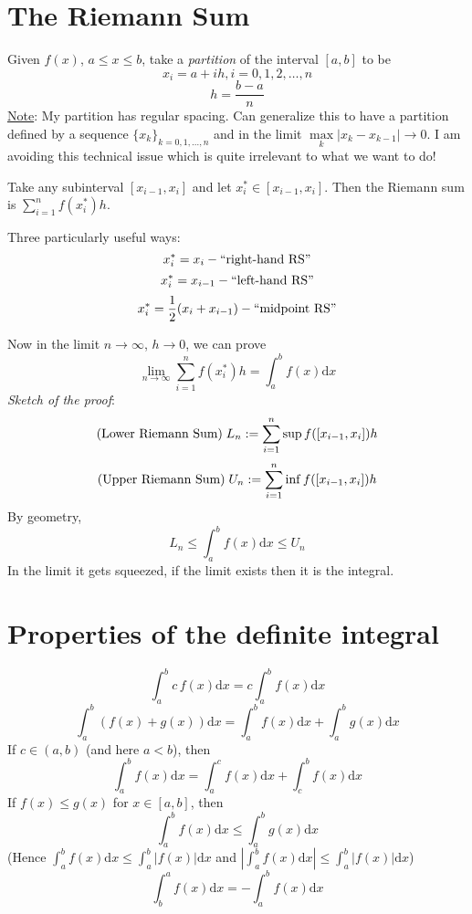 \documentclass[12pt]{report}
\theoremstyle{definition}
\begin{document}
\section{The Riemann Sum}
Given $f(x)$, $a \le x \le b$, take a \emph{partition} of the interval $[a,b]$ to be \[
    x_i = a + ih, i = 0,1,2,\ldots,n
\]\[
    h = \frac{b-a}{n}
\]
\underline{Note}: My partition has regular spacing. Can generalize this to have a partition defined by a sequence 
${\{x_k\}}_{k=0,1,\ldots,n}$ and in the limit $\max\limits_{k}\mathopen|x_k - x_{k-1}\mathclose| \rightarrow 0$.
I am avoiding this technical issue which is quite irrelevant to what we want to do!

Take any subinterval $[x_{i-1}, x_i]$ and let $x^*_i \in [x_{i-1}, x_i]$. Then the Riemann sum is $\sum_{i=1}^n f(x_i^*)h$.

Three particularly useful ways: \[
    x^*_i = x_i - \textnormal{``right-hand RS''}
\]\[
    x^*_i = x_{i-1} - \textnormal{``left-hand RS''}
\]\[
    x^*_i = \frac{1}{2}(x_i + x_{i-1}) - \textnormal{``midpoint RS''}
\]

Now in the limit $n \rightarrow \infty$, $h \rightarrow 0$, we can prove \[
    \lim_{n \rightarrow \infty} \sum_{i=1}^n f(x_i^*)h = \int_a^b f(x) \mathrm{d}x
\]
\emph{Sketch of the proof}: \[
    \textnormal{(Lower Riemann Sum)} \; L_n := \sum_{i=1}^n {\sup f([x_{i-1},x_i])} h
\]\[
    \textnormal{(Upper Riemann Sum)} \; U_n := \sum_{i=1}^n {\inf f([x_{i-1},x_i])} h
\]
By geometry, \[
    L_n \le \int_a^b f(x)\mathrm{d}x \le U_n
\]
In the limit it gets squeezed, if the limit exists then it is the integral.

\section{Properties of the definite integral}
\begin{equation}
    \int_a^b c\,f(x)\mathrm{d}x = c\int_a^b f(x)\mathrm{d}x
\end{equation}
\begin{equation}
    \int_a^b (f(x) + g(x))\mathrm{d}x = \int_a^b f(x)\mathrm{d}x + \int_a^b g(x)\mathrm{d}x
\end{equation}
If $c\in(a,b)$ (and here $a<b$), then
\begin{equation}
    \int_a^b f(x)\mathrm{d}x = \int_a^c f(x)\mathrm{d}x + \int_c^b f(x)\mathrm{d}x
\end{equation}
If $f(x) \le g(x)$ for $x \in [a,b]$, then
\begin{equation}
    \int_a^b f(x)\mathrm{d}x \le \int_a^b g(x)\mathrm{d}x
\end{equation}
(Hence $\int_a^b f(x)\mathrm{d}x \le \int_a^b |f(x)|\mathrm{d}x$ 
and $|\int_a^b f(x)\mathrm{d}x| \le \int_a^b |f(x)|\mathrm{d}x$)
\begin{equation}
    \int_b^a f(x)\mathrm{d}x = -\int_a^b f(x)\mathrm{d}x
\end{equation}
\end{document}
